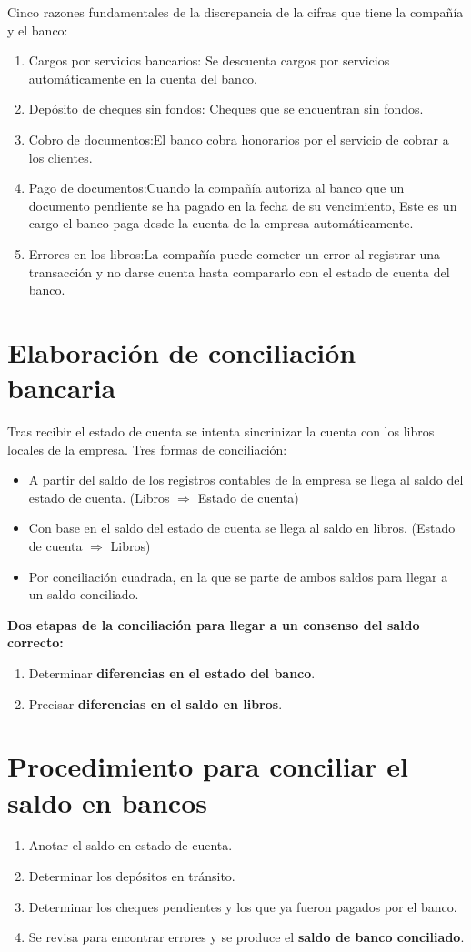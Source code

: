 \documentclass{article}
\begin{document}
Cinco razones fundamentales de la discrepancia de la cifras que tiene la compañía y el banco:
\begin{enumerate}
    \item Cargos por servicios bancarios: Se descuenta cargos por servicios automáticamente en la cuenta del banco.
    \item Depósito de cheques sin fondos: Cheques que se encuentran sin fondos.
    \item Cobro de documentos:El banco cobra honorarios por el servicio de cobrar a los clientes.
    \item Pago de documentos:Cuando la compañía autoriza al banco que un documento pendiente se ha pagado en la fecha de su vencimiento, Este es un cargo el banco paga desde la cuenta de la empresa automáticamente.
    \item Errores en los libros:La compañía puede cometer un error al registrar una transacción y no darse cuenta hasta compararlo con el estado de cuenta del banco.
\end{enumerate}


\section{Elaboración de conciliación bancaria}
Tras recibir el estado de cuenta se intenta sincrinizar la cuenta con los libros locales de la empresa.
Tres formas de conciliación:
\begin{itemize}
    \item A partir del saldo de los registros contables de la empresa se llega al saldo del estado de cuenta. (Libros $\Rightarrow $ Estado de cuenta)
    \item Con base en el saldo del estado de cuenta se llega al saldo en libros. (Estado de cuenta $\Rightarrow$ Libros)
    \item Por conciliación cuadrada, en la que se parte de ambos saldos para llegar a un saldo conciliado. 
\end{itemize}

\textbf{Dos etapas de la conciliación para llegar a un consenso del saldo correcto:}
\begin{enumerate}
    \item Determinar \textbf{diferencias en el estado del banco}.
    \item Precisar \textbf{diferencias en el saldo en libros}.
\end{enumerate}

\section{Procedimiento para conciliar el saldo en bancos}
\begin{enumerate}
    \item Anotar el saldo en estado de cuenta.
    \item Determinar los depósitos en tránsito.
    \item Determinar los cheques pendientes y los que ya fueron pagados por el banco.
    \item Se revisa para encontrar errores y se produce el \textbf{saldo de banco conciliado}.
\end{enumerate}
\end{document}

